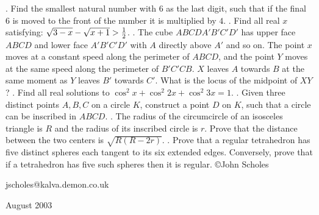\nopagenumbers
{}
\vskip 25pt
. Find the smallest natural number with $6$ as the last digit, such that if the final $6$ is moved to the front of the number it is multiplied by $4$.
\vskip 12pt
. Find all real $x$ satisfying: $\sqrt{3-x}-\sqrt{x+1}>{1\over2}$.
\vskip 12pt
. The cube $ABCDA'B'C'D'$ has upper face $ABCD$ and lower face $A'B'C'D'$ with $A$ directly above $A'$ and so on. The point $x$ moves at a constant speed along the perimeter of $ABCD$, and the point $Y$ moves at the same speed along the perimeter of $B'C'CB$. $X$ leaves $A$ towards $B$ at the same moment as $Y$ leaves $B'$ towards $C'$. What is the locus of the midpoint of $XY$?
\vskip 12pt
. Find all real solutions to $\cos^2x+\cos^2{2x}+\cos^2{3x}=1$.
\vskip 12pt
. Given three distinct points $A,B,C$ on a circle $K$, construct a point $D$ on $K$, such that a circle can be inscribed in $ABCD$.
\vskip 12pt
. The radius of the circumcircle of an isosceles triangle is $R$ and the radius of its inscribed circle is $r$. Prove that the distance between the two centers is $\sqrt{R(R-2r)}$.
\vskip 12pt
. Prove that a regular tetrahedron has five distinct spheres each tangent to its six extended edges. Conversely, prove that if a tetrahedron has five such spheres then it is regular.
\vskip 20pt
\noindent \copyright John Scholes

\noindent jscholes@kalva.demon.co.uk

 August 2003

\bye
